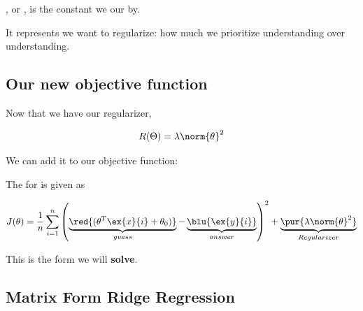         \begin{definition}
            , or \vocab{$\lambda$}, is the constant we  our  by.
            
            It represents  we want to regularize: how much we prioritize  understanding over  understanding.
        \end{definition}
    
    
    
    \subsection*{Our new objective function}
    
        Now that we have our regularizer,
        
        \begin{equation}
            R(\Theta) = \lambda \norm{\theta}^2
        \end{equation}
        
        We can add it to our objective function:\\
        
        \begin{kequation}
            The  for  is given as 
            
            \begin{equation*}
                J(\theta) = 
                            \frac{1}{n}  \sum_{i=1}^n 
                            \left( 
                                \underbrace{
                                    \red{(\theta^T \ex{x}{i}  
                                    + \theta_0)}
                                }_{guess}
                                - \underbrace{
                                    \blu{\ex{y}{i}} 
                                }_{answer}
                            \right)^2 
                            + 
                            \underbrace{
                                \pur{ \lambda \norm{\theta}^2 }
                            }_{Regularizer}
            \end{equation*}
        \end{kequation}
        
        This is the form we will \textbf{solve}.
    
    \subsection*{Matrix Form Ridge Regression}
        
